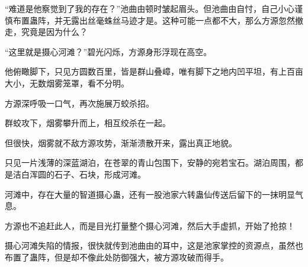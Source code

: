 \begin{this_body}
“难道是他察觉到了我的存在？”池曲由顿时皱起眉头。但池曲由自忖，自己小心谨慎布置蛊阵，并无露出丝毫蛛丝马迹才是。这种可能一点都不大，那么方源忽然撤走，究竟是因为什么？

“这里就是摄心河滩？”碧光闪烁，方源身形浮现在高空。

他俯瞰脚下，只见方圆数百里，皆是群山叠嶂，唯有脚下之地内凹平坦，有上百亩大小，无数烟雾笼罩，看不分明。

方源深呼吸一口气，再次施展万蛟杀招。

群蛟攻下，烟雾攀升而上，相互绞杀在一起。

但很快，烟雾就不敌方源攻势，渐渐溃散开来，露出真正地貌。

只见一片浅薄的深蓝湖泊，在苍翠的青山包围下，安静的宛若宝石。湖泊周围，都是洁白浑圆的石子、石块，形成河滩。

河滩中，存在大量的智道摄心蛊，还有一股池家六转蛊仙传送后留下的一抹明显气息。

方源也不追赶此人，而是目光打量整个摄心河滩，然后大手虚抓，开始了抢掠！

摄心河滩失陷的情报，很快就传到池曲由的耳中，这是池家掌控的资源点，虽然也布置了蛊阵，但是却不像此处防御强大，被方源攻破而得手。

\end{this_body}

